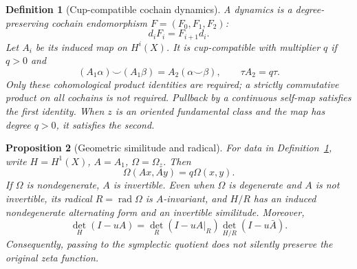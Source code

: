\documentclass[11pt,a4paper]{article}
\newtheorem{definition}{Definition}[section]
\newtheorem{proposition}[definition]{Proposition}
\theoremstyle{remark}\newtheorem{remark}[definition]{Remark}
\newcommand{\rad}{\operatorname{rad}}\newcommand{\Str}{\operatorname{Str}}
\begin{document}
\begin{definition}[Cup-compatible cochain dynamics]\label{def:dynamics}
A dynamics is a degree-preserving cochain endomorphism $F=(F_0,F_1,F_2)$:
\[
d_iF_i=F_{i+1}d_i.
\]
Let $A_i$ be its induced map on $H^i(X)$. It is \emph{cup-compatible with multiplier $q$} if $q>0$ and
\[
(A_1\alpha)\smile(A_1\beta)=A_2(\alpha\smile\beta),
\qquad \tau A_2=q\tau.
\tag{2.2}\label{eq:cup-compat}
\]
Only these cohomological product identities are required; a strictly commutative product on all cochains is not required. Pullback by a continuous self-map satisfies the first identity. When $z$ is an oriented fundamental class and the map has degree $q>0$, it satisfies the second.
\end{definition}

\begin{proposition}[Geometric similitude and radical]\label{prop:similitude}
For data in Definition~\ref{def:dynamics}, write $H=H^1(X)$, $A=A_1$, $\Omega=\Omega_z$. Then
\[
\Omega(Ax,Ay)=q\Omega(x,y).\tag{2.3}
\]
If $\Omega$ is nondegenerate, $A$ is invertible. Even when $\Omega$ is degenerate and $A$ is not invertible, its radical $R=\rad\Omega$ is $A$-invariant, and $H/R$ has an induced nondegenerate alternating form and an invertible similitude. Moreover,
\[
\det_H(I-uA)=\det_R(I-uA|_R)\det_{H/R}(I-u\bar A).
\tag{2.4}\label{eq:rad-factor}
\]
Consequently, passing to the symplectic quotient does not silently preserve the original zeta function.
\end{proposition}
\end{document}
